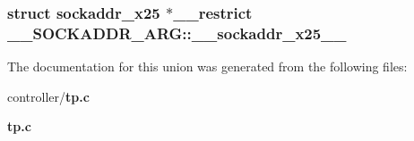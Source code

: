 \subsubsection[{\_\-\_\-sockaddr\_\-x25\_\-\_\-}]{\setlength{\rightskip}{0pt plus 5cm}struct sockaddr\_\-x25 $\ast$\_\-\_\-restrict {\bf \_\-\_\-SOCKADDR\_\-ARG::\_\-\_\-sockaddr\_\-x25\_\-\_\-}}\label{union____SOCKADDR__ARG_affb43692eba13f4400fb85a872540ac6}


The documentation for this union was generated from the following files:\begin{DoxyCompactItemize}
\item 
controller/{\bf tp.c}\item 
{\bf tp.c}\end{DoxyCompactItemize}
